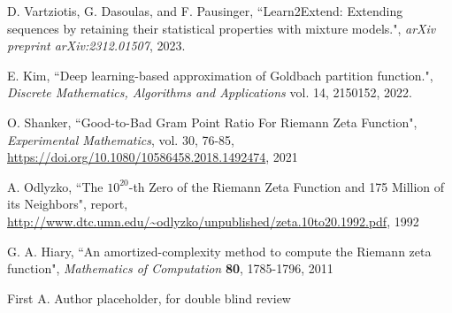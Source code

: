 \documentclass[journal]{IEEEtai}
\begin{document}
\begin{thebibliography}{34}
D. Vartziotis, G. Dasoulas,  and  F. Pausinger,
``Learn2Extend: Extending sequences by retaining their statistical properties with mixture models.",
\emph{arXiv preprint arXiv:2312.01507}, 2023.

E. Kim, 
``Deep learning-based approximation of Goldbach partition function.",
\emph{Discrete Mathematics, Algorithms and Applications} vol. 14,  2150152, 2022.

 O. Shanker, 
``Good-to-Bad Gram Point Ratio For Riemann Zeta Function",
\emph{Experimental Mathematics}, vol. 30, 76-85, 
\url{https://doi.org/10.1080/10586458.2018.1492474}, 2021

  A. Odlyzko,
``The $10^{20}$-th Zero of the Riemann Zeta
Function and 175 Million of its Neighbors", report,
\url{http://www.dtc.umn.edu/~odlyzko/unpublished/zeta.10to20.1992.pdf}, 1992

 G. A. Hiary,
``An amortized-complexity method to compute the Riemann zeta function", 
{\it Mathematics of Computation} {\bf80}, 1785-1796, 2011


\end{thebibliography}






\begin{IEEEbiography}{First A. Author}{\space}   placeholder, for double blind review
\end{IEEEbiography}
\end{document}
